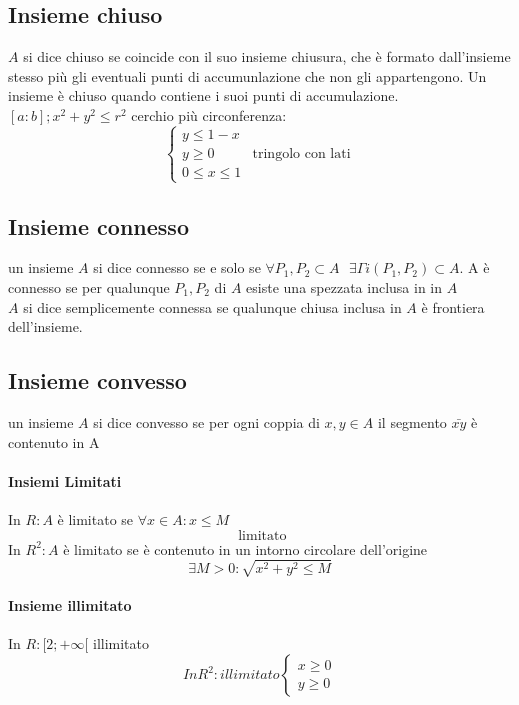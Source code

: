 \subsection{Insieme chiuso}
\begin{defi}
  $A$ si dice chiuso se coincide con il suo insieme chiusura, che è formato dall'insieme stesso più gli
  eventuali punti di accumunlazione che non gli appartengono. Un insieme è chiuso quando contiene i suoi punti
  di accumulazione. $[a:b]; x^2+y^2\leq r^2$ cerchio più circonferenza:
  \begin{equation}
    \begin{cases}
        y\leq 1-x\\
        y\geq 0& \text{tringolo con lati}\\
        0\leq x\leq 1
    \end{cases} 
  \end{equation}
\end{defi}
\subsection{Insieme connesso}
\begin{defi}
  un insieme $A$ si dice connesso se e solo se $\forall P_1,P_2\subset A \text{ }
  \exists \Gamma i(P_1,P_2)\subset A$. A è connesso se per qualunque $P_1,P_2$ di $A$ esiste una spezzata
  inclusa in in $A$\\
  $A$ si dice {\color{red} semplicemente connessa} se qualunque chiusa inclusa in $A$ è frontiera dell'insieme.
\end{defi}
\subsection{Insieme convesso}
\begin{defi}
  un insieme $A$ si dice convesso se per ogni coppia di $x,y\in A$ il segmento $\bar{xy}$ è contenuto in A
\end{defi}
\begin{multicols}{2}
  \paragraph{Insiemi Limitati}
  In $R:A$ è limitato se $\forall x \in A:x\leq M$
  \begin{equation*}
    [-1;1]\text{ limitato}
  \end{equation*}
  In $R^2: A$ è limitato se è contenuto in un intorno circolare dell'origine
  \begin{equation}
    \exists M>0: \sqrt{x^2+y^2\leq M}
  \end{equation}
  \paragraph{Insieme illimitato}
  In $R: [2;+\infty [$ illimitato
  \begin{equation}
    In R^2: illimitato \begin{cases}
                         x\geq 0\\
                         y\geq 0
                       \end{cases}
  \end{equation}                     
\end{multicols}
